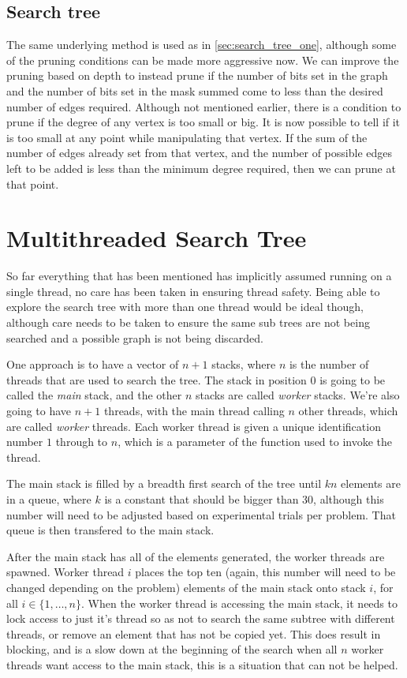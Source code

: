 \documentclass[a4paper]{article}
\begin{document}
\subsection{Search tree}
The same underlying method is used as in \ref{sec:search_tree_one}, although some of the pruning conditions can be made more aggressive now. We can improve the pruning based on depth to instead prune if the number of bits set in the graph and the number of bits set in the mask summed come to less than the desired number of edges required. Although not mentioned earlier, there is a condition to prune if the degree of any vertex is too small or big. It is now possible to tell if it is too small at any point while manipulating that vertex. If the sum of the number of edges already set from that vertex, and the number of possible edges left to be added is less than the minimum degree required, then we can prune at that point.

\section{Multithreaded Search Tree}
So far everything that has been mentioned has implicitly assumed running on a single thread, no care has been taken in ensuring thread safety. Being able to explore the search tree with more than one thread would be ideal though, although care needs to be taken to ensure the same sub trees are not being searched and a possible graph is not being discarded.

One approach is to have a vector of $n+1$ stacks, where $n$ is the number of threads that are used to search the tree. The stack in position 0 is going to be called the \emph{main} stack, and the other $n$ stacks are called \emph{worker} stacks. We're also going to have $n+1$ threads, with the main thread calling $n$ other threads, which are called \emph{worker} threads. Each worker thread is given a unique identification number $1$ through to $n$, which is a parameter of the function used to invoke the thread.

The main stack is filled by a breadth first search of the tree until $kn$ elements are in a queue, where $k$ is a constant that should be bigger than 30, although this number will need to be adjusted based on experimental trials per problem. That queue is then transfered to the main stack.

After the main stack has all of the elements generated, the worker threads are spawned. Worker thread $i$ places the top ten (again, this number will need to be changed depending on the problem) elements of the main stack onto stack $i$, for all $i\in\{1,\ldots,n\}$. When the worker thread is accessing the main stack, it needs to lock access to just it's thread so as not to search the same subtree with different threads, or remove an element that has not be copied yet. This does result in blocking, and is a slow down at the beginning of the search when all $n$ worker threads want access to the main stack, this is a situation that can not be helped.
\end{document}
